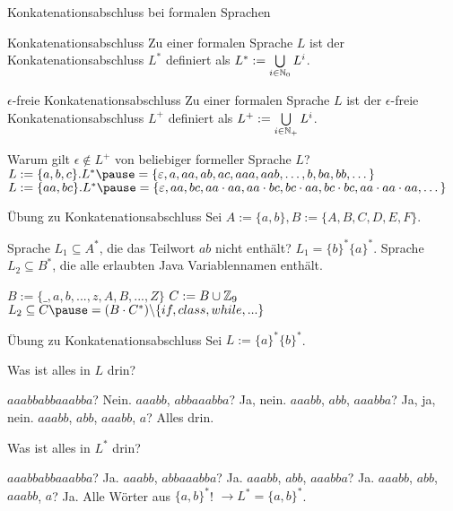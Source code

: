 \begin{frame}{Konkatenationsabschluss bei formalen Sprachen}
	\p
	\begin{block}{Konkatenationsabschluss}
		Zu einer formalen Sprache $L$ \pause ist der Konkatenationsabschluss $L^*$ definiert \pause als $L^* := \bigcup\limits_{i \in \mathbb{N}_0} L^i$.
	\end{block}
	\p
	\begin{block}{$\epsilon$-freie Konkatenationsabschluss}
		Zu einer formalen Sprache $L$ \pause ist der $\epsilon$-freie Konkatenationsabschluss $L^+$ definiert \pause als $L^+ := \bigcup\limits_{i \in \mathbb{N}_+} L^i$.
	\end{block}

	\begin{itemize}
		\pitem Warum gilt $\epsilon \notin L^+$ von beliebiger formeller Sprache $L$?
		\pitem $L := \{a, b, c\}.  L^* \pause = \{\epsilon, a, aa, ab, ac, aaa, aab, \dots, b, ba, bb, \dots \}$
		\pitem $L := \{aa, bc\}.  L^* \pause = \{\epsilon, aa, bc, aa\cdot aa, aa\cdot bc, bc \cdot aa, bc \cdot bc, aa \cdot aa \cdot aa, \dots \}$
	\end{itemize}
\end{frame}

\begin{frame}{Übung zu Konkatenationsabschluss}
	Sei $A := \{a, b\}, B := \{A, B, C, D, E, F\}$.
	\begin{itemize}
		\pitem Sprache $L_1 \subseteq A^*$, die das Teilwort $ab$ nicht enthält? \pause $L_1 = \{b\}^*\{a\}^*$.
		\pitem Sprache $L_2 \subseteq B^*$, die alle erlaubten Java Variablennamen enthält.
		\begin{itemize}
			\pitem $B := \{\_,a,b,...,z,A,B,...,Z\}$
			\pitem $C := B \cup \mathbb{Z}_9$
			\pitem $L_2 \subseteq C \pause = (B \cdot C^*) \backslash \{if, class, while, ...\}$
		\end{itemize}
	\end{itemize}
\end{frame}

\begin{frame}{Übung zu Konkatenationsabschluss}
	\pause Sei $L := \{a\}^*\{b\}^*$.
	\begin{itemize}
		\pitem Was ist alles in $L$ drin?
		\begin{itemize}
			\pitem $aaabbabbaaabba$? \pause Nein.
			\pitem $aaabb$, $abbaaabba$? \pause Ja, nein.
			\pitem $aaabb$, $abb$, $aaabba$? \pause Ja, ja, nein.
			\pitem $aaabb$, $abb$, $aaabb$, $a$? \pause Alles drin.
		\end{itemize}
		\pitem Was ist alles in $L^*$ drin?
		\begin{itemize}
			\pitem $aaabbabbaaabba$? \pause Ja.
			\pitem $aaabb$, $abbaaabba$? \pause Ja.
			\pitem $aaabb$, $abb$, $aaabba$? \pause Ja.
			\pitem $aaabb$, $abb$, $aaabb$, $a$? \pause Ja.
			\pitem Alle Wörter aus $\{a,b\}^*$! \pause $\rightarrow L^* = \{a,b\}^*$.
		\end{itemize}
	\end{itemize}
\end{frame}

